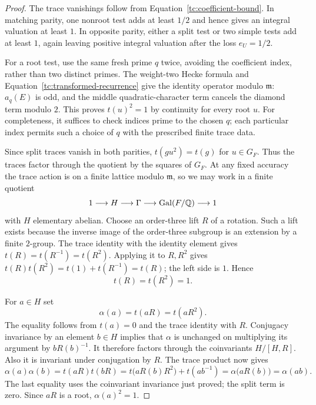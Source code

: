 \begin{proof}
The trace vanishings follow from
Equation~\eqref{tc:coefficient-bound}.  In matching parity, one
nonroot test adds at least $1/2$ and hence gives an integral
valuation at least $1$.  In opposite parity, either a split test
or two simple tests add at least $1$, again leaving positive
integral valuation after the loss $e_U=1/2$.

For a root test, use the same fresh prime $q$ twice, avoiding the
coefficient index, rather than two distinct primes.  The weight-two
Hecke formula and Equation~\eqref{tc:transformed-recurrence} give
the identity operator modulo $\mathfrak m$: $a_q(E)$ is odd, and
the middle quadratic-character term cancels the diamond term
modulo $2$.  This proves $t(u)^2=1$ by continuity for every root
$u$.  For completeness, it suffices to check indices prime to the
chosen $q$; each particular index permits such a choice of $q$
with the prescribed finite trace data.

Since split traces vanish in both parities,
$t(gu^2)=t(g)$ for $u\in G_F$.  Thus the traces factor through
the quotient by the squares of $G_F$.  At any fixed accuracy the
trace action is on a finite lattice modulo $\mathfrak m$, so we
may work in a finite quotient
\[
       1\longrightarrow H\longrightarrow\Gamma
          \longrightarrow\operatorname{Gal}(F/\mathbb Q)\longrightarrow1
\]
with $H$ elementary abelian.  Choose an order-three lift $R$ of a
rotation.  Such a lift exists because the inverse image of the
order-three subgroup is an extension by a finite $2$-group.
The trace identity with the identity element gives
$t(R)=t(R^{-1})=t(R^2)$.  Applying it to $R,R^2$ gives
$t(R)t(R^2)=t(1)+t(R^{-1})=t(R)$; the left side is $1$.
Hence
\[
                           t(R)=t(R^2)=1.
\]

For $a\in H$ set
\[
                       \alpha(a)=t(aR)=t(aR^2).
\]
The equality follows from $t(a)=0$ and the trace identity with
$R$.  Conjugacy invariance by an element $b\in H$ implies that
$\alpha$ is unchanged on multiplying its argument by
$bR(b)^{-1}$.  It therefore factors through the coinvariants
$H/[H,R]$.  Also it is invariant under conjugation by $R$.
The trace product now gives
\[
 \alpha(a)\alpha(b)
   =t(aR)t(bR)
   =t\bigl(aR(b)R^2\bigr)+t(ab^{-1})
   =\alpha\bigl(aR(b)\bigr)
   =\alpha(ab).
\]
The last equality uses the coinvariant invariance just proved;
the split term is zero.  Since $aR$ is a root,
$\alpha(a)^2=1$.


\end{proof}
